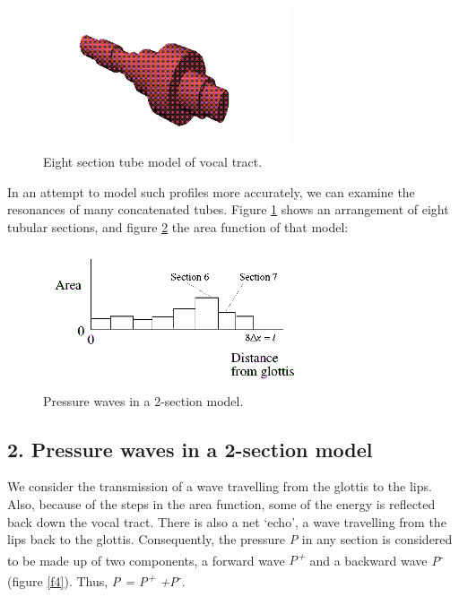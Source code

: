 \begin{figure}[htbp]
\begin{center}
\includegraphics[width=0.65\textwidth]{mp/img/eight-section-model.png}
\caption{Eight section tube model of vocal tract.}
\label{f2}
\end{center}
\end{figure}

\newpage

In an attempt to model such profiles more accurately, we can examine the resonances of many concatenated tubes. Figure \ref{f2} shows an arrangement of eight tubular sections, and figure \ref{f3} the area function of that model:

\begin{figure}[htbp]
\begin{center}
\includegraphics[width=0.7\textwidth]{mp/img/eight-areas.png}
\caption{Pressure waves in a 2-section model.}
\label{f3}
\end{center}
\end{figure}

\vspace{-6mm}

\subsection*{2. Pressure waves in a 2-section model}

We consider the transmission of a wave travelling from the glottis to the lips. Also, because of the steps in the area function, some of the energy is reflected back down the vocal tract. There is also a net `echo', a wave travelling from the lips back to the glottis. Consequently, the pressure \textit{P} in any section is considered to be made up of two components, a forward wave \textit{P\textsuperscript{+}} and a backward wave \textit{P}\textsuperscript{-} (figure \ref{f4}). Thus, \textit{P = P\textsuperscript{+} +P}\textsuperscript{-}.

